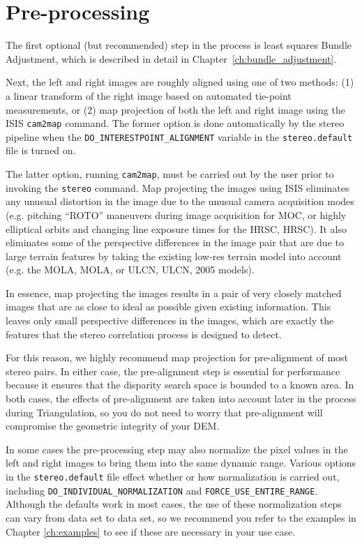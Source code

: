 \section{Pre-processing}

The first optional (but recommended) step in the process is least
squares Bundle Adjustment, which is described in detail in
Chapter~\ref{ch:bundle_adjustment}. 

Next, the left and right images are roughly aligned using one of
two methods: (1) a linear transform of the right image based on
automated tie-point measurements, or (2) map projection of both the
left and right image using the \ac{ISIS} \texttt{cam2map} command.  The
former option is done automatically by the stereo pipeline when the
\texttt{DO\_INTERESTPOINT\_ALIGNMENT} variable in the
\texttt{stereo.default} file is turned on.

The latter option, running {\tt cam2map}, must be carried out by
the user prior to invoking the {\tt stereo} command.  Map projecting
the images using \ac{ISIS} eliminates any unusual distortion in the
image due to the unusual camera acquisition modes (e.g. pitching
``ROTO'' maneuvers during image acquisition for \ac{MOC}, or highly
elliptical orbits and changing line exposure times for the \acl{HRSC},
\acs{HRSC}).  It also eliminates some of the perspective differences
in the image pair that are due to large terrain features by taking
the existing low-res terrain model into account (e.g. the \acl{MOLA},
\acs{MOLA}, or \acl{ULCN}, \acs{ULCN}, 2005 models).

In essence, map projecting the images results in a pair of very
closely matched images that are as close to ideal as possible given
existing information.  This leaves only small perspective differences
in the images, which are exactly the features that the stereo
correlation process is designed to detect.  

For this reason, we highly recommend map projection for pre-alignment
of most stereo pairs.  In either case, the pre-alignment step is
essential for performance because it ensures that the disparity search
space is bounded to a known area.  In both cases, the effects of
pre-alignment are taken into account later in the process during
Triangulation, so you do not need to worry that pre-alignment will
compromise the geometric integrity of your \ac{DEM}.

In some cases the pre-processing step may also normalize the pixel
values in the left and right images to bring them into the same
dynamic range.  Various options in the {\tt stereo.default} file
effect whether or how normalization is carried out, including
\texttt{DO\_INDIVIDUAL\_NORMALIZATION} and
\texttt{FORCE\_USE\_ENTIRE\_RANGE}.  Although the defaults work in
most cases, the use of these normalization steps can vary from data
set to data set, so we recommend you refer to the examples in Chapter
\ref{ch:examples} to see if these are necessary in your use case.

